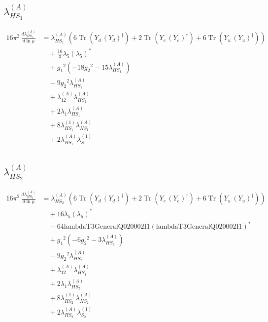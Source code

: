 \documentclass[10pt,a4paper]{article}
\begin{document}
\subsection*{$\lambda_{HS_1}^{(A)}$}
\begin{align*}
16\pi^2\,\frac{d \lambda_{HS_1}^{(A)}}{d\ln\mu} &={\lambda_{HS_1}^{(A)}} (6 \operatorname{Tr}\!\left({Y_d}\,\left({Y_d}\right)^{\dagger}\right)+2 \operatorname{Tr}\!\left({Y_e}\,\left({Y_e}\right)^{\dagger}\right)+6 \operatorname{Tr}\!\left({Y_u}\,\left({Y_u}\right)^{\dagger}\right)) \\
&\quad +\frac{16}{3} {\lambda_5} \left({\lambda_5}\right)^{*} \\
&\quad +{g_1}^2 \left(-18 {g_2}^2-15 {\lambda_{HS_1}^{(A)}}\right) \\
&\quad -9 {g_2}^2 {\lambda_{HS_1}^{(A)}} \\
&\quad +{\lambda_{12}^{(A)}} {\lambda_{HS_2}^{(A)}} \\
&\quad +2 {\lambda_1} {\lambda_{HS_1}^{(A)}} \\
&\quad +8 {\lambda_{HS_1}^{(1)}} {\lambda_{HS_1}^{(A)}} \\
&\quad +2 {\lambda_{HS_1}^{(A)}} {\lambda_{S_1}^{(1)}} \\
\end{align*}
\subsection*{$\lambda_{HS_2}^{(A)}$}
\begin{align*}
16\pi^2\,\frac{d \lambda_{HS_2}^{(A)}}{d\ln\mu} &={\lambda_{HS_2}^{(A)}} (6 \operatorname{Tr}\!\left({Y_d}\,\left({Y_d}\right)^{\dagger}\right)+2 \operatorname{Tr}\!\left({Y_e}\,\left({Y_e}\right)^{\dagger}\right)+6 \operatorname{Tr}\!\left({Y_u}\,\left({Y_u}\right)^{\dagger}\right)) \\
&\quad +16 {\lambda_5} \left({\lambda_5}\right)^{*} \\
&\quad -64 \text{lambdaT3GeneralQ020002I1} \left(\text{lambdaT3GeneralQ020002I1}\right)^{*} \\
&\quad +{g_1}^2 \left(-6 {g_2}^2-3 {\lambda_{HS_2}^{(A)}}\right) \\
&\quad -9 {g_2}^2 {\lambda_{HS_2}^{(A)}} \\
&\quad +{\lambda_{12}^{(A)}} {\lambda_{HS_1}^{(A)}} \\
&\quad +2 {\lambda_1} {\lambda_{HS_2}^{(A)}} \\
&\quad +8 {\lambda_{HS_2}^{(1)}} {\lambda_{HS_2}^{(A)}} \\
&\quad +2 {\lambda_{HS_2}^{(A)}} {\lambda_{S_2}^{(1)}} \\
\end{align*}
\end{document}
